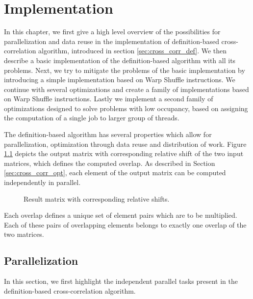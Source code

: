 \chapter{Implementation}

In this chapter, we first give a high level overview of the possibilities for parallelization and data reuse in the implementation of definition-based cross-correlation algorithm, introduced in section \ref{sec:cross_corr_def}. We then describe a basic implementation of the definition-based algorithm with all its problems. Next, we try to mitigate the problems of the basic implementation by introducing a simple implementation based on Warp Shuffle instructions. We continue with several optimizations and create a family of implementations based on Warp Shuffle instructions. Lastly we implement a second family of optimizations designed to solve problems with low occupancy, based on assigning the computation of a single job to larger group of threads.


The definition-based algorithm has several properties which allow for parallelization, optimization through data reuse and distribution of work. Figure \ref{fig:cross_corr_shifts} depicts the output matrix with corresponding relative shift of the two input matrices, which defines the computed overlap. As described in Section \ref{sec:cross_corr_opt}, each element of the output matrix can be computed independently in parallel.

\begin{figure}[ht]
	\fontsize{6}{8}\selectfont
	\centering
	\def\svgwidth{0.55\textwidth}
	
	\caption{Result matrix with corresponding relative shifts.}
	\label{fig:cross_corr_shifts}
\end{figure}

Each overlap defines a unique set of element pairs which are to be multiplied. Each of these pairs of overlapping elements belongs to exactly one overlap of the two matrices.


\section{Parallelization}
\label{sec:implementation_parallelism}
In this section, we first highlight the independent parallel tasks present in the definition-based cross-correlation algorithm.  


